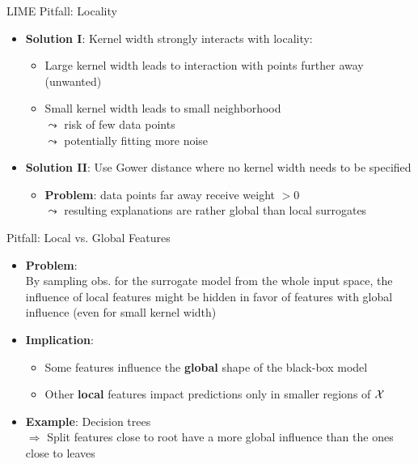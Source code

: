 \documentclass[11pt,compress,t,notes=noshow, aspectratio=169, xcolor=table]{beamer}
\begin{document}
\begin{frame}[c]{LIME Pitfall: Locality }
    \begin{itemize} 
         \item \textbf{Solution I}: Kernel width strongly interacts with locality:
         \begin{itemize}
             \item Large kernel width leads to interaction with points further away (unwanted)
             \item Small kernel width leads to small neighborhood\\
             $\leadsto$ risk of few data points\\
             $\leadsto$ potentially fitting more noise
         \end{itemize}
         \pause
    	\item \textbf{Solution II}: Use Gower distance where no kernel width needs to be specified 
    	\begin{itemize}
    	    \item \textbf{Problem}: data points far away receive weight $ > 0$\\
    	    $\leadsto$ resulting explanations are rather global than local surrogates   
    	\end{itemize}
    \end{itemize}
\vspace{0.3cm}

\end{frame}

\begin{frame}[c]{Pitfall: Local vs. Global Features }

\begin{itemize}%
	\item<1-> \textbf{Problem}: \\
	By sampling obs. for the surrogate model from the whole input space, the influence of local features might be hidden in favor of features with global influence (even for small kernel width)
	\item<2-> \textbf{Implication}: 
	\begin{itemize}
	    \item Some features influence the \textbf{global} shape of the black-box model
	    \item Other \textbf{local} features impact predictions only in smaller regions of $\mathcal{X}$ %
	\end{itemize}
	\item<3-> \textbf{Example}: Decision trees\\
	$\Rightarrow$ Split features close to root have a more global influence than the ones close to leaves
\end{itemize}

\end{frame}
\end{document}
